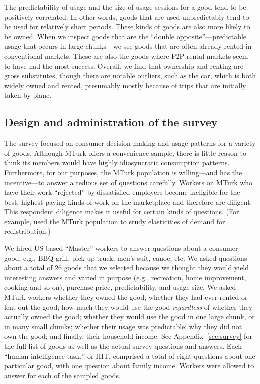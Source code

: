 \documentclass[12pt]{article}
\begin{document}
The predictability of usage and the size of usage sessions for a good tend to be positively correlated.
In other words, goods that are used unpredictably tend to be used for relatively short periods.
These kinds of goods are also more likely to be owned. 
When we inspect goods that are the ``double opposite''---predictable usage that occurs in large chunks---we see goods that are often already rented in conventional markets.
These are also the goods where P2P rental markets seem to have had the most success.
Overall, we find that ownership and renting are gross substitutes, though there are notable outliers, such as the car, which is both widely owned and rented, presumably mostly because of trips that are initially taken by plane. 

\subsection{Design and administration of the survey}
The survey focused on consumer decision making and usage patterns for a variety of goods. 
Although MTurk offers a convenience sample, there is little reason to think its members would have highly idiosyncratic consumption patterns. 
Furthermore, for our purposes, the MTurk population is willing---and has the incentive---to answer a tedious set of questions carefully.
Workers on MTurk who have their work ``rejected'' by dissatisfied employers become ineligible for the best, highest-paying kinds of work on the marketplace and therefore are diligent. 
This respondent diligence makes it useful for certain kinds of questions.
(For example, \cite{kuziemko2013elastic} used the MTurk population to study elasticities of demand for redistribution.)

We hired US-based ``Master'' workers to answer questions about a consumer good, e.g., BBQ grill, pick-up truck, men's suit, canoe, etc.
We asked questions about a total of 26 goods that we selected because we thought they would yield interesting answers and varied in purpose (e.g., recreation, home improvement, cooking and so on), purchase price, predictability, and usage size. 
We asked MTurk workers whether they owned the good; whether they had ever rented or lent out the good; how much they would use the good \emph{regardless} of whether they actually owned the good; whether they would use the good in one large chunk, or in many small chunks; whether their usage was predictable; why they did not own the good; and finally, their household income. 
See Appendix~\ref{sec:survey} for the full list of goods as well as the actual survey questions and answers.  
Each ``human intelligence task,'' or HIT, comprised a total of eight questions about one particular good, with one question about family income. 
Workers were allowed to answer for each of the sampled goods.  
\end{document}
